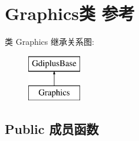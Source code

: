 \hypertarget{class_graphics}{}\section{Graphics类 参考}
\label{class_graphics}
类 Graphics 继承关系图\+:\begin{figure}[H]
\begin{center}
\leavevmode
\includegraphics[height=2.000000cm]{class_graphics}
\end{center}
\end{figure}
\subsection*{Public 成员函数}
